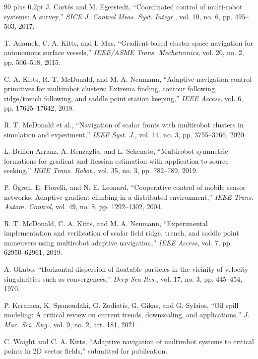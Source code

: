 \documentclass[lettersize,journal]{IEEEtran}
\begin{document}
\begin{thebibliography}{99}
\itemsep 0pt plus 0.2pt
\parskip 0pt
 J. Cortés and M. Egerstedt, ``Coordinated control of multi-robot
systems: A survey,'' \textit{SICE J. Control Meas. Syst. Integr.},
vol. 10, no. 6, pp. 495--503, 2017.

 T. Adamek, C. A. Kitts, and I. Mas, ``Gradient-based cluster space
navigation for autonomous surface vessels,'' \textit{IEEE/ASME Trans.
Mechatronics}, vol. 20, no. 2, pp. 506--518, 2015.

 C. A. Kitts, R. T. McDonald, and M. A. Neumann, ``Adaptive
navigation control primitives for multirobot clusters: Extrema finding,
contour following, ridge/trench following, and saddle point station keeping,''
\textit{IEEE Access}, vol. 6, pp. 17625--17642, 2018.

 R. T. McDonald et al., ``Navigation of
scalar fronts with multirobot clusters in simulation and experiment,''
\textit{IEEE Syst. J.}, vol. 14, no. 3, pp. 3755--3766, 2020.

 L. Briñón-Arranz, A. Renzaglia, and L. Schenato, ``Multirobot
symmetric formations for gradient and Hessian estimation with application to
source seeking,'' \textit{IEEE Trans. Robot.}, vol. 35, no. 3,
pp. 782--789, 2019.

 P. Ögren, E. Fiorelli, and N. E. Leonard, ``Cooperative control
of mobile sensor networks: Adaptive gradient climbing in a distributed
environment,'' \textit{IEEE Trans. Autom. Control}, vol. 49, no. 8,
pp. 1292--1302, 2004.

 R. T. McDonald, C. A. Kitts, and M. A. Neumann, ``Experimental
implementation and verification of scalar field ridge, trench, and saddle
point maneuvers using multirobot adaptive navigation,'' \textit{IEEE Access},
vol. 7, pp. 62950--62961, 2019.

 A. Okubo, ``Horizontal dispersion of floatable particles in the
vicinity of velocity singularities such as convergences,'' \textit{Deep-Sea
Res.}, vol. 17, no. 3, pp. 445--454, 1970.

 P. Keramea, K. Spanoudaki, G. Zodiatis, G. Gikas, and
G. Sylaios, ``Oil spill modeling: A critical review on current trends,
downscaling, and applications,'' \textit{J. Mar. Sci. Eng.}, vol. 9,
no. 2, art. 181, 2021.

 C. Waight and C. A. Kitts, ``Adaptive navigation of multirobot
systems to critical points in 2D vector fields,'' submitted for publication.


\end{thebibliography}
\end{document}
